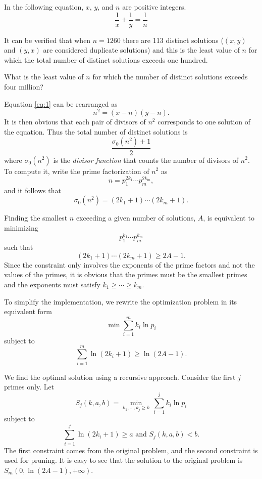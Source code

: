 





In the following equation, $x$, $y$, and $n$ are positive integers.
\begin{equation}
\frac{1}{x} + \frac{1}{y} = \frac{1}{n} \label{eq:1}
\end{equation}

It can be verified that when $n = 1260$ there are 113 distinct solutions ($(x,y)$ and $(y,x)$ are considered duplicate solutions) and this is the least value of $n$ for which the total number of distinct solutions exceeds one hundred.
 
What is the least value of $n$ for which the number of distinct solutions exceeds four million?

\solution

Equation \eqref{eq:1} can be rearranged as
\[
n^2=(x-n)(y-n).
\]
It is then obvious that each pair of divisors of $n^2$ corresponds to one solution of the equation. Thus the total number of distinct solutions is
\[
\frac{\sigma_0(n^2)+1}{2}
\]
where $\sigma_0(n^2)$ is the \emph{divisor function} that counts the number of divisors of $n^2$. To compute it, write the prime factorization of $n^2$ as
\[
n = p_1^{2k_1} \cdots p_m^{2k_m} ,
\]
and it follows that
\[
\sigma_0(n^2) = (2 k_1+1) \cdots (2 k_m+1) .
\]

Finding the smallest $n$ exceeding a given number of solutions, $A$, is equivalent to minimizing
\[
p_1^{k_1} \cdots p_m^{k_m}
\]
such that
\[
(2 k_1+1) \cdots (2 k_m+1) \ge 2A-1 .
\]
Since the constraint only involves the exponents of the prime factors and not the values of the primes, it is obvious that the primes must be the smallest primes and the exponents must satisfy $k_1 \ge \cdots \ge k_m$.

To simplify the implementation, we rewrite the optimization problem in its equivalent form
\[
\textstyle
\min \sum_{i=1}^m k_i \ln p_i
\]
subject to
\[
\textstyle
\sum_{i=1}^m \ln(2 k_i+1) \ge \ln(2A-1) .
\]

We find the optimal solution using a recursive approach. Consider the first $j$ primes only. Let
\[
S_j(k,a,b) = \min_{k_1,\ldots,k_j \ge k} \, \sum_{i=1}^j k_i \ln p_i
\]
subject to
\[
\sum_{i=1}^j \ln(2k_i+1) \ge a \text{ and } S_j(k,a,b) < b .
\]
The first constraint comes from the original problem, and the second constraint is used for pruning. It is easy to see that the solution to the original problem is $S_m(0,\ln(2A-1),+\infty)$.

